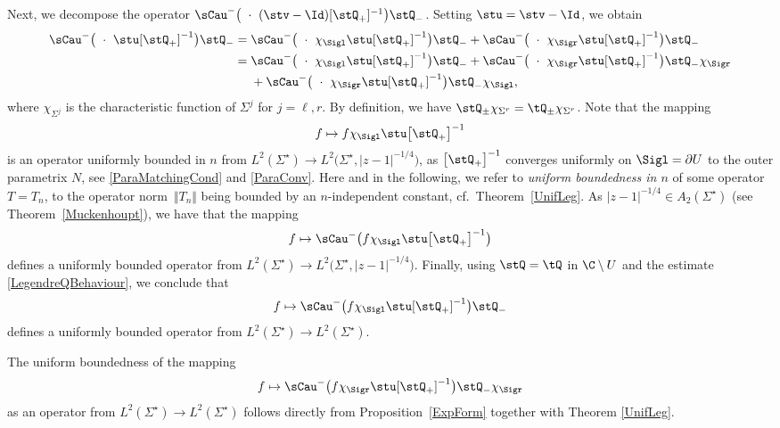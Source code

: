Next, we decompose the operator $\sCau^-\big(\ \cdot \ (\stv-\Id) [\stQ_+]^{-1}\big)\stQ_-$. Setting $\stu = \stv-\Id$, we obtain
\begin{align*}
 \sCau^-\big(\ \cdot \ \stu [\stQ_+]^{-1}\big)\stQ_- ={}&
 \sCau^-\big(\ \cdot \ \chi_{\Sigl} \stu [\stQ_+]^{-1}\big)\stQ_- + \sCau^-\big(\ \cdot \ \chi_{\Sigr} \stu [\stQ_+]^{-1}\big)\stQ_-
 \\
 ={}& \sCau^-\big(\ \cdot \ \chi_{\Sigl} \stu [\stQ_+]^{-1}\big)\stQ_- + \sCau^-\big(\ \cdot \ \chi_{\Sigr} \stu [\stQ_+]^{-1}\big)\stQ_-\chi_{\Sigr}
 \\
 & + \sCau^-\big(\ \cdot \ \chi_{\Sigr} \stu [\stQ_+]^{-1}\big)\stQ_-\chi_{\Sigl},
\end{align*}
where $\chi_{\Sigma^j}$ is the characteristic function of $\Sigma^j$ for $j = \ell, r$. By definition, we have $\stQ_\pm \chi_{\Sigma^r} = \tQ_\pm \chi_{\Sigma^r}$. Note that the mapping
\begin{align*}
f \mapsto f\chi_{\Sigl} \stu \big[\stQ_+\big]^{-1}
\end{align*}
is an operator uniformly bounded in $n$ from $L^2(\Sigma^\star) \to L^2\big(\Sigma^\star, |z-1|^{-1/4}\big)$, as $\big[\stQ_+\big]^{-1}$ converges uniformly on $\Sigl = \partial U$ to the outer parametrix $N$, see \eqref{ParaMatchingCond} and \eqref{ParaConv}. Here and in the following, we refer to \emph{uniform boundedness in $n$} of some operator $T = T_n$, to the operator norm~$\Vert T_n \Vert$ being bounded by an $n$-independent constant, cf.\ Theorem~\ref{UnifLeg}. As $|z-1|^{-1/4} \in A_2(\Sigma^\star)$ (see Theorem~\ref{Muckenhoupt}), we have that the mapping
\begin{align*}
 f \mapsto \sCau^{-}\big(f\chi_{\Sigl} \stu \big[\stQ_+\big]^{-1}\big)
\end{align*}
defines a uniformly bounded operator from $L^2(\Sigma^\star) \to L^2\big(\Sigma^\star, |z-1|^{-1/4}\big)$. Finally, using $\stQ = \tQ$ in $\C \setminus U$ and the estimate \eqref{LegendreQBehaviour}, we conclude that
\begin{align*}
 f \mapsto \sCau^{-}\big(f\chi_{\Sigl} \stu [\stQ_+]^{-1}\big)\stQ_-
\end{align*}
defines a uniformly bounded operator from $L^2(\Sigma^\star) \to L^2(\Sigma^\star)$.

The uniform boundedness of the mapping
\begin{align*}
 f \mapsto \sCau^-\big(f\chi_{\Sigr} \stu [\stQ_+]^{-1}\big)\stQ_-\chi_{\Sigr}
\end{align*}
as an operator from $L^2(\Sigma^\star) \to L^2(\Sigma^\star)$ follows directly from Proposition~\ref{ExpForm} together with Theorem \ref{UnifLeg}.

